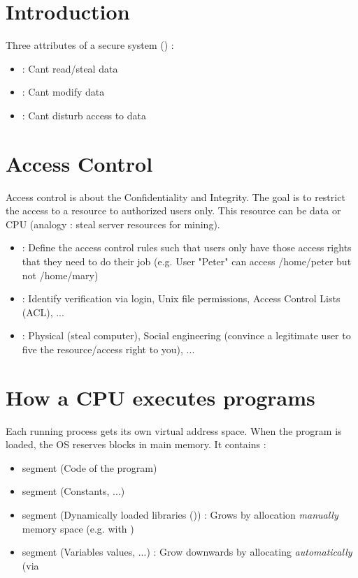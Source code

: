 \begingroup
\let\clearpage\relax
\chapter{Introduction}

Three attributes of a secure system () :
\begin{itemize}
    \item {} : Cant read/steal data
    \item {} : Cant modify data
    \item {} : Cant disturb access to data
\end{itemize}

\chapter{Access Control}

Access control is about the Confidentiality and Integrity. The goal is to restrict the access to a resource to authorized users only.
This resource can be data or CPU (analogy : steal server resources for mining).
\begin{itemize}
    \item {} : Define the access control rules such that users only have those access rights that they need to do their job (e.g. User "Peter" can access /home/peter but not /home/mary)
    \item {} : Identify verification via login, Unix file permissions, Access Control Lists (ACL), ...
    \item {} : Physical (steal computer), Social engineering (convince a legitimate user to five the resource/access right to you), ...
\end{itemize}

\chapter{How a CPU executes programs}

Each running process gets its own virtual address space. When the program is loaded, the OS reserves blocks in main memory. It contains :
\begin{itemize}
    \item {} segment (Code of the program)
    \item {} segment (Constants, ...)
    \item {} segment (Dynamically loaded libraries ()) : Grows by allocation \textit{manually} memory space (e.g. with )
    \item {} segment (Variables values, ...) : Grow downwards by allocating \textit{automatically} (via 
\end{itemize}

